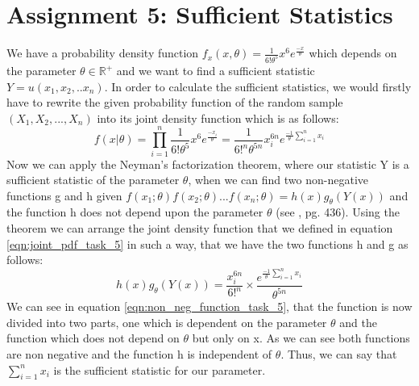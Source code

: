 \chapter{Assignment 5: Sufficient Statistics}
We have a probability density function $f_x(x,\theta) = \frac{1}{6! \theta^5}x^6e^{\frac{-x}{\theta}}$ which depends on the parameter $\theta \in \mathbb{R}^+$ and we want to find a sufficient statistic $Y=u(x_1, x_2,..x_n)$. In order to calculate the sufficient statistics, we would firstly have to rewrite the given probability function of the random sample $(X_1, X_2, ..., X_n)$ into its joint density function which is as follows:
\begin{equation} \label{eqn:joint_pdf_task_5}
        f(x|\theta) = \prod_{i=1}^{n} \frac{1}{6! \theta^5}x^6e^{\frac{-x_i}{\theta}} = \frac{1}{6!^n \theta^{5n}}x_i^{6n}e^{\frac{-1}{\theta} \sum_{i=1}^{n}x_i} 
\end{equation}
Now we can apply the Neyman's factorization theorem, where our statistic Y is a sufficient statistic of the parameter $\theta$, when we can find two non-negative functions g and h given $f(x_1;\theta)f(x_2;\theta)...f(x_n;\theta)=h(x) g_{\theta}(Y(x))$ and the function h does not depend upon the parameter $\theta$ (see \cite{hogg:2005}, pg. 436). Using the theorem we can arrange the joint density function that we defined in equation \ref{eqn:joint_pdf_task_5} in such a way, that we have the two functions h and g as follows:
\begin{equation} \label{eqn:non_neg_function_task_5}
   h(x) g_{\theta}(Y(x)) = \frac{x_i^{6n}}{6!^n} \times \frac{e^{\frac{-1}{\theta} \sum_{i=1}^{n}x_i}}{\theta^{5n}} 
\end{equation}\newline\newline
We can see in equation \ref{eqn:non_neg_function_task_5}, that the function is now divided into two parts, one which is dependent on the parameter $\theta$ and the function which does not depend on $\theta$ but only on x. As we can see both functions are non negative and the function h is independent of $\theta$. Thus, we can say that $\sum_{i=1}^{n}x_i$ is the sufficient statistic for our parameter. 